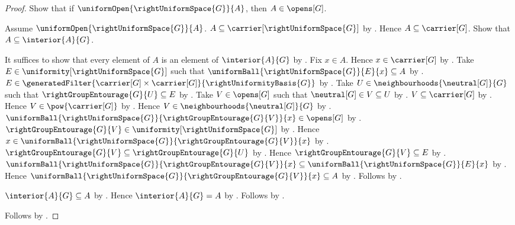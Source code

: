 \begin{proof}
    Show that if $\uniformOpen{\rightUniformSpace{G}}{A}$, then
        $A\in\opens[G]$.
    \begin{subproof}
        Assume $\uniformOpen{\rightUniformSpace{G}}{A}$.
        $A\subseteq\carrier[\rightUniformSpace{G}]$
            by .
        Hence $A\subseteq\carrier[G]$.
        Show that $A\subseteq\interior{A}{G}$.
        \begin{subproof}
            It suffices to show that every element of $A$ is an element of
                $\interior{A}{G}$ by .
            Fix $x\in A$.
            Hence $x\in\carrier[G]$ by .
            Take $E\in\uniformity[\rightUniformSpace{G}]$ such that
                $\uniformBall{\rightUniformSpace{G}}{E}{x}\subseteq A$
                by .
            $E\in\generatedFilter
                {\carrier[G]\times\carrier[G]}{\rightUniformityBasis{G}}$
                by .
            Take $U\in\neighbourhoods{\neutral[G]}{G}$ such that
                $\rightGroupEntourage{G}{U}\subseteq E$
                by .
            Take $V\in\opens[G]$ such that
                $\neutral[G]\in V\subseteq U$ by .
            $V\subseteq\carrier[G]$ by .
            Hence $V\in\pow{\carrier[G]}$ by .
            Hence $V\in\neighbourhoods{\neutral[G]}{G}$
                by .
            $\uniformBall{\rightUniformSpace{G}}
                {\rightGroupEntourage{G}{V}}{x}\in\opens[G]$
                by .
            $\rightGroupEntourage{G}{V}
                \in\uniformity[\rightUniformSpace{G}]$
                by .
            Hence $x\in\uniformBall{\rightUniformSpace{G}}
                {\rightGroupEntourage{G}{V}}{x}$
                by .
            $\rightGroupEntourage{G}{V}
                \subseteq\rightGroupEntourage{G}{U}$
                by .
            Hence $\rightGroupEntourage{G}{V}\subseteq E$
                by .
            $\uniformBall{\rightUniformSpace{G}}
                    {\rightGroupEntourage{G}{V}}{x}
                \subseteq\uniformBall{\rightUniformSpace{G}}{E}{x}$
                by .
            Hence $\uniformBall{\rightUniformSpace{G}}
                {\rightGroupEntourage{G}{V}}{x}\subseteq A$
                by .
            Follows by .
        \end{subproof}
        $\interior{A}{G}\subseteq A$ by .
        Hence $\interior{A}{G}=A$ by .
        Follows by .
    \end{subproof}
    Follows by \auto.
\end{proof}

